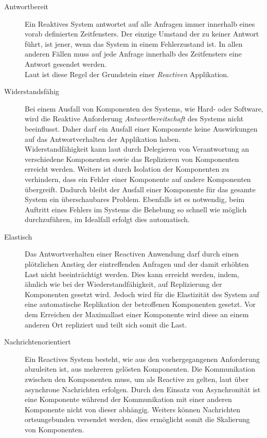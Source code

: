 \begin{description}
    \item[Antwortbereit]\label{reactivo:responsive}
    Ein Reaktives System antwortet auf alle Anfragen immer innerhalb eines vorab definierten Zeitfensters. Der einzige Umstand der zu keiner Antwort führt, ist jener, wenn das System in einem Fehlerzustand ist. In allen anderen Fällen muss auf jede Anfrage innerhalb des Zeitfensters eine Antwort gesendet werden.\\
    Laut \cite{reactiveManifesto} ist diese Regel der Grundstein einer \textit{Reactiven} Applikation.
    \item[Widerstandsfähig]\label{reactivo:resilient}
    Bei einem Ausfall von Komponenten des Systems, wie Hard- oder Software, wird die Reaktive Anforderung \textit{Antwortbereitschaft} des Systems nicht beeinflusst. Daher darf ein Ausfall einer Komponente keine Auswirkungen auf das Antwortverhalten der Applikation haben.\\
    Widerstandfähigkeit kann laut \cite{reactiveManifesto} durch Delegieren von Verantwortung an verschiedene Komponenten sowie das Replizieren von Komponenten erreicht werden. Weiters ist durch Isolation der Komponenten zu verhindern, dass ein Fehler einer Komponente auf andere Komponenten übergreift. Dadurch bleibt der Ausfall einer Komponente für das gesamte System ein überschaubares Problem. Ebenfalls ist es notwendig, beim Auftritt eines Fehlers im Systems die Behebung so schnell wie möglich durchzuführen, im Idealfall erfolgt dies automatisch.
    \item[Elastisch]\label{reactivo:elastic}
    Das Antwortverhalten einer Reactiven Anwendung darf durch einen plötzlichen Anstieg der eintreffenden Anfragen und der damit erhöhten Last nicht beeinträchtigt werden. Dies kann erreicht werden, indem, ähnlich wie bei der Wiederstandfähigkeit, auf Replizierung der Komponenten gesetzt wird. Jedoch wird für die Elastizität des System auf eine automatische Replikation der betroffenen Komponenten gesetzt. Vor dem Erreichen der Maximallast einer Komponente wird diese an einem anderen Ort repliziert und teilt sich somit die Last. 
    \item[Nachrichtenorientiert]\label{reactivo:messageDriven}
    Ein Reactives System besteht, wie aus den vorhergegangenen Anforderung abzuleiten ist, aus mehreren gelösten Komponenten. Die Kommunikation zwischen den Komponenten muss, um als Reactive zu gelten, laut \cite{reactiveManifesto}  über asynchrone Nachrichten erfolgen. Durch den Einsatz von Asynchronität ist eine Komponente während der Kommunikation mit einer anderen Komponente nicht von dieser abhängig. Weiters können Nachrichten ortsungebunden versendet werden, dies ermöglicht somit die Skalierung von Komponenten. 
\end{description} 
